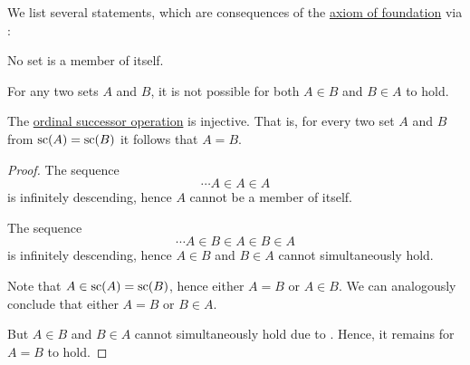 \begin{corollary}\label{thm:simple_foundation_theorems}
  We list several statements, which are consequences of the \hyperref[def:zfc/foundation]{axiom of foundation} via :

  \begin{thmenum}
     No set is a member of itself.

     For any two sets \( A \) and \( B \), it is not possible for both \( A \in B \) and \( B \in A \) to hold.

     The \hyperref[def:ordinal_successor]{ordinal successor operation} is injective. That is, for every two set \( A \) and \( B \) from \( \op{sc}(A) = \op{sc}(B) \) it follows that \( A = B \).
  \end{thmenum}
\end{corollary}
\begin{proof}
   The sequence
  \begin{equation*}
    \cdots A \in A \in A
  \end{equation*}
  is infinitely descending, hence \( A \) cannot be a member of itself.

   The sequence
  \begin{equation*}
    \cdots A \in B \in A \in B \in A
  \end{equation*}
  is infinitely descending, hence \( A \in B \) and \( B \in A \) cannot simultaneously hold.

   Note that \( A \in \op{sc}(A) = \op{sc}(B) \), hence either \( A = B \) or \( A \in B \). We can analogously conclude that either \( A = B \) or \( B \in A \).

  But \( A \in B \) and \( B \in A \) cannot simultaneously hold due to . Hence, it remains for \( A = B \) to hold.
\end{proof}

